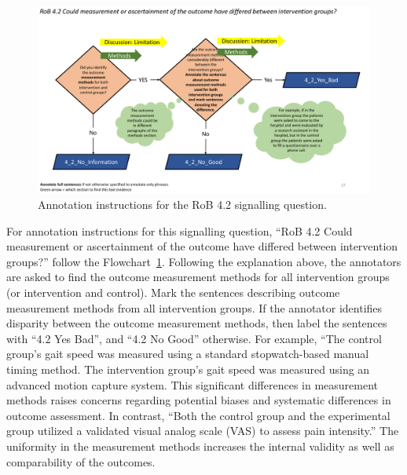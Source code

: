 \documentclass[sn-mathphys,Numbered]{sn-jnl}%
\begin{document}
%
%
%
\begin{figure}[hbt]
    \centering
    \includegraphics[width=\textwidth]{figures/4_2.pdf}
    \caption{Annotation instructions for the RoB 4.2 signalling question.}
    \label{fig:4_2}
\end{figure}
%
%
%

For annotation instructions for this signalling question, ``RoB 4.2 Could measurement or ascertainment of the outcome have differed between intervention groups?'' follow the Flowchart~\ref{fig:4_2}.
Following the explanation above, the annotators are asked to find the outcome measurement methods for all intervention groups (or intervention and control).
Mark the sentences describing outcome measurement methods from all intervention groups.
If the annotator identifies disparity between the outcome measurement methods, then label the sentences with ``4.2 Yes Bad'', and ``4.2 No Good'' otherwise.
For example, ``The control group's gait speed was measured using a standard stopwatch-based manual timing method. The intervention group's gait speed was measured using an advanced motion capture system.
This significant differences in measurement methods raises concerns regarding potential biases and systematic differences in outcome assessment.
In contrast, ``Both the control group and the experimental group utilized a validated visual analog scale (VAS) to assess pain intensity.''
The uniformity in the measurement methods increases the internal validity as well as comparability of the outcomes.
%
%
%
\end{document}
